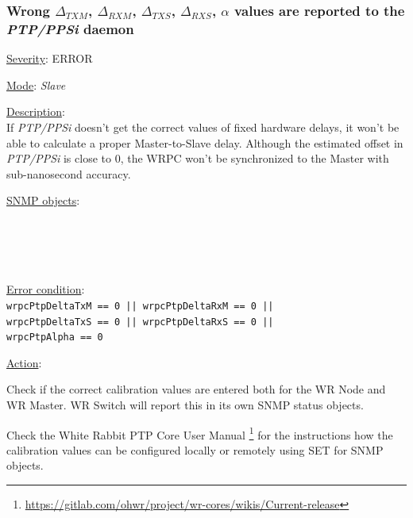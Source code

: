 \subsubsection{\bf Wrong $\Delta_{TXM}$, $\Delta_{RXM}$, $\Delta_{TXS}$,
		$\Delta_{RXS}$, $\alpha$ values are reported to the \emph{PTP/PPSi} daemon}
		\label{fail:timing:deltas_report}
		\begin{pck_descr}
			\item [] \underline{Severity}: ERROR
			\item [] \underline{Mode}: \emph{Slave}
			\item [] \underline{Description}:\\
				If \emph{PTP/PPSi} doesn't get the correct values of fixed hardware delays,
				it won't be able to calculate a proper Master-to-Slave delay. Although
				the estimated offset in \emph{PTP/PPSi} is close to 0, the WRPC won't be
				synchronized to the Master with sub-nanosecond accuracy.
			\item [] \underline{SNMP objects}:\\
				{\footnotesize
				\\
				\\
				\\
				\\
				 }
			\item [] \underline{Error condition}:\\
				{\footnotesize
				\texttt{wrpcPtpDeltaTxM == 0 || wrpcPtpDeltaRxM == 0 ||}\\
				\texttt{wrpcPtpDeltaTxS == 0 || wrpcPtpDeltaRxS == 0 ||}\\
				\texttt{wrpcPtpAlpha == 0} }
      \item [] \underline{Action}:
        \begin{pck_proc}
        \item Check if the correct calibration values are entered both for the WR
          Node and WR Master. WR Switch will report this in its own SNMP status
          objects.
        \item Check the White Rabbit PTP Core User Manual
          \footnote{\url{https://gitlab.com/ohwr/project/wr-cores/wikis/Current-release}}
          for the instructions how the calibration values can be configured
          locally or remotely using SET for SNMP objects.
        \end{pck_proc}
		\end{pck_descr}

